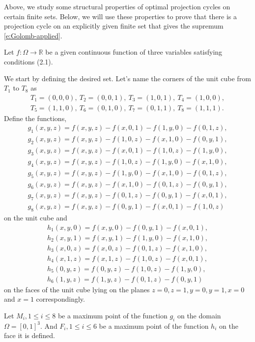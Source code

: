 \documentclass[12p]{article}
\numberwithin{equation}{section}
\begin{document}
Above, we study some structural properties of optimal projection cycles on certain finite sets. Below, we will use these properties to prove that there is a projection cycle on an explicitly given finite set that gives the supremum \eqref{e:Golomb-applied}. 

Let \(f:\Omega\rightarrow \mathbb{R}\) be a given continuous function of three variables satisfying conditions (2.1). 

We start by defining the desired set. Let's name the corners of the unit cube from \(T_1\) to \(T_8\) as 
\begin{align*}
    T_1=(0,0,0), \ T_2=(0,0,1), \ T_3=(1,0,1), \ T_4=(1,0,0),\\
    T_5=(1,1,0), \ T_6=(0,1,0), \ T_7=(0,1,1), \ T_8=(1,1,1).
\end{align*}
Define the functions,
\begin{align*}
    g_1(x,y,z)=f(x,y,z)-f(x,0,1)-f(1,y,0)-f(0,1,z), \\
    g_2(x,y,z)=f(x,y,z)-f(1,0,z)-f(x,1,0)-f(0,y,1), \\
    g_3(x,y,z)=f(x,y,z)-f(x,0,1)-f(1,0,z)-f(1,y,0), \\
    g_4(x,y,z)=f(x,y,z)-f(1,0,z)-f(1,y,0)-f(x,1,0), \\
    g_5(x,y,z)=f(x,y,z)-f(1,y,0)-f(x,1,0)-f(0,1,z), \\
    g_6(x,y,z)=f(x,y,z)-f(x,1,0)-f(0,1,z)-f(0,y,1), \\
    g_7(x,y,z)=f(x,y,z)-f(0,1,z)-f(0,y,1)-f(x,0,1), \\
    g_8(x,y,z)=f(x,y,z)-f(0,y,1)-f(x,0,1)-f(1,0,z)
\end{align*}
on the unit cube and
\begin{align*}
    h_1(x,y,0)=f(x,y,0)-f(0,y,1)-f(x,0,1),\\
    h_2(x,y,1)=f(x,y,1)-f(1,y,0)-f(x,1,0),\\
    h_3(x,0,z)=f(x,0,z)-f(0,1,z)-f(x,1,0),\\
    h_4(x,1,z)=f(x,1,z)-f(1,0,z)-f(x,0,1),\\
    h_5(0,y,z)=f(0,y,z)-f(1,0,z)-f(1,y,0),\\
    h_6(1,y,z)=f(1,y,z)-f(0,1,z)-f(0,y,1)
\end{align*}
on the faces of the unit cube lying on the planes \(z=0,z=1,y=0,y=1,x=0\) and \(x=1\) correspondingly.

Let \(M_i,1\le i \le 8\) be a maximum point of the function \(g_i\) on the domain \(\Omega=[0,1]^3\).
And \(F_i,1\le i \le 6\) be a maximum point of the function \(h_i\) on the face it is defined.
\end{document}
